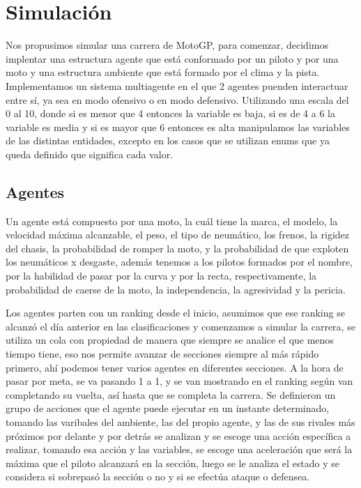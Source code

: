 \documentclass[12pt, letterpaper,spanish]{article}
\theoremstyle{definition}
\theoremstyle{remark}
\begin{document}
\section{Simulación}\cite{conferenciasS}\cite{garcia}
	Nos propusimos simular una carrera de MotoGP, para comenzar, decidimos implentar una estructura agente que está conformado por un piloto y por una moto y una estructura ambiente que está formado por el clima y la pista. Implementamos un sistema multiagente en el que 2 agentes puenden interactuar entre sí, ya sea en modo ofensivo o en modo defensivo. Utilizando una escala del 0 al 10, donde si es menor que 4 entonces la variable es baja, si es de 4 a 6 la variable es media y si es mayor que 6 entonces es alta manipulamos las variables de las distintas entidades, excepto en los casos que se utilizan enums que ya queda definido que significa cada valor.
	
	\subsection{Agentes}
		Un agente está compuesto por una moto, la cuál tiene la marca, el modelo, la velocidad máxima alcanzable, el peso, el tipo de neumático, los frenos, la rigidez del chasis, la probabilidad de romper la moto, y la probabilidad de que exploten los neumáticos x desgaste, además tenemos a los pilotos formados por el nombre, por la habilidad de pasar por la curva y por la recta, respectivamente, la probabilidad de caerse de la moto, la independencia, la agresividad y la pericia.
		
		Los agentes parten con un ranking desde el inicio, asumimos que ese ranking se alcanzó el día anterior en las clasificaciones y comenzamos a simular la carrera, se utiliza un cola con propiedad de manera que siempre se analice el que menos tiempo tiene, eso nos permite avanzar de secciones siempre al más rápido primero, ahí podemos tener varios agentes en diferentes secciones. A la hora de pasar por meta, se va pasando 1 a 1, y se van mostrando en el ranking según van completando su vuelta, así hasta que se completa la carrera. Se definieron un grupo de acciones que el agente puede ejecutar en un instante determinado, tomando las varibales del ambiente, las del propio agente, y las de sus rivales más próximos por delante y por detrás se analizan y se escoge una acción específica a realizar, tomando esa acción y las variables, se escoge una aceleración que será la máxima que el piloto alcanzará en la sección, luego se le analiza el estado y se considera si sobrepasó la sección o no y si se efectúa ataque o defensea. 
		
\end{document}
